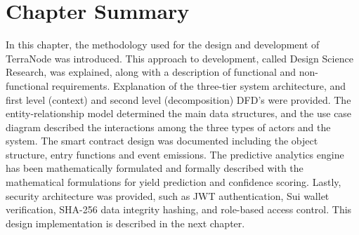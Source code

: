 \section{Chapter Summary}

In this chapter, the methodology used for the design and development of TerraNode was introduced. This approach to development, called Design Science Research, was explained, along with a description of functional and non-functional requirements. Explanation of the three-tier system architecture, and first level (context) and second level (decomposition) DFD's were provided. The entity-relationship model determined the main data structures, and the use case diagram described the interactions among the three types of actors and the system. The smart contract design was documented including the object structure, entry functions and event emissions. The predictive analytics engine has been mathematically formulated and formally described with the mathematical formulations for yield prediction and confidence scoring. Lastly, security architecture was provided, such as JWT authentication, Sui wallet verification, SHA-256 data integrity hashing, and role-based access control. This design implementation is described in the next chapter.